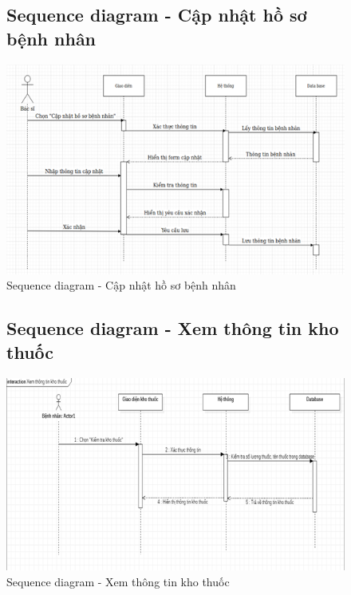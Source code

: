 \documentclass{report}
\begin{document}
\begin{center}
	\begin{figure}[!htp]
		\subsection{Sequence diagram - Cập nhật hồ sơ bệnh nhân}
		\begin{center}
			\includegraphics[scale=1.1]{Hinh/Sequence diagram Cập nhật hồ sơ bệnh nhân.png}
		\end{center}
		\caption{Sequence diagram - Cập nhật hồ sơ bệnh nhân}
	\end{figure}
\end{center}

\pagebreak
\begin{center}
	\begin{figure}[!htp]
		\subsection{Sequence diagram - Xem thông tin kho thuốc}
		\begin{center}
			\includegraphics[scale=1]{Hinh/Sequence diagram Xem thông tin kho thuốc.png}
		\end{center}
		\caption{Sequence diagram - Xem thông tin kho thuốc}
	\end{figure}
\end{center}
\end{document}

